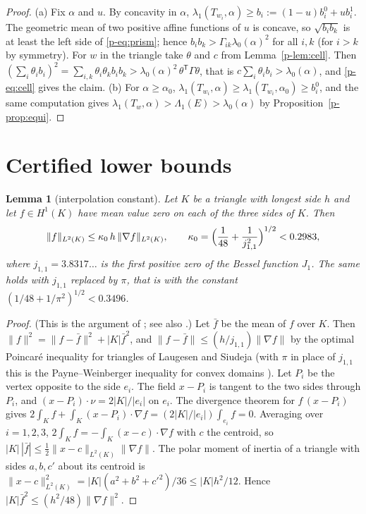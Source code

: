 \documentclass[11pt]{article}
\newtheorem{lemma}[theorem]{Lemma}
\theoremstyle{remark}
\begin{document}
\begin{proof}
(a) Fix $\alpha$ and $u$. By concavity in $\alpha$,
$\lambda_1(T_{w_i},\alpha)\ge b_i:=(1-u)b_i^0+ub_i^1$. The geometric mean of two positive
affine functions of $u$ is concave, so $\sqrt{b_ib_k}$ is at least the left side of
\eqref{p-eq:prism}; hence $b_ib_k>\Gamma_{ik}\lambda_0(\alpha)^2$ for all $i,k$ (for $i>k$ by
symmetry). For $w$ in the triangle take $\theta$ and $c$ from Lemma~\ref{p-lem:cell}. Then
$(\sum_i\theta_ib_i)^2=\sum_{i,k}\theta_i\theta_kb_ib_k>\lambda_0(\alpha)^2\,
\theta^{\mathsf T}\Gamma\theta$, that is $c\sum_i\theta_ib_i>\lambda_0(\alpha)$, and
\eqref{p-eq:cell} gives the claim. (b) For $\alpha\ge\alpha_0$,
$\lambda_1(T_{w_i},\alpha)\ge\lambda_1(T_{w_i},\alpha_0)\ge b_i^0$, and the same computation
gives $\lambda_1(T_w,\alpha)>\Lambda_1(E)>\lambda_0(\alpha)$ by Proposition~\ref{p-prop:equi}.
\end{proof}


\section{Certified lower bounds}\label{p-sec:cert}

\begin{lemma}[interpolation constant]\label{p-lem:interp}
Let $K$ be a triangle with longest side $h$ and let $f\in H^1(K)$ have mean value zero on each
of the three sides of $K$. Then
\[
  \|f\|_{L^2(K)}\le\kappa_0\,h\,\|\nabla f\|_{L^2(K)},\qquad
  \kappa_0=\Bigl(\frac1{48}+\frac1{j_{1,1}^2}\Bigr)^{1/2}<0.2983,
\]
where $j_{1,1}=3.8317\ldots$ is the first positive zero of the Bessel function $J_1$. The same
holds with $j_{1,1}$ replaced by $\pi$, that is with the constant
$(1/48+1/\pi^2)^{1/2}<0.3496$.
\end{lemma}

\begin{proof}
(This is the argument of \cite{CGal}; see also \cite{CG}.) Let $\bar f$ be the mean of $f$ over
$K$. Then $\|f\|^2=\|f-\bar f\|^2+|K|\bar f^2$, and $\|f-\bar f\|\le(h/j_{1,1})\|\nabla f\|$
by the optimal Poincar\'e inequality for triangles of Laugesen and Siudeja \cite{LaSiPoincare}
(with $\pi$ in place of $j_{1,1}$ this is the Payne--Weinberger inequality for convex domains
\cite{PW,Bebendorf}). Let $P_i$ be the vertex opposite to the side $e_i$. The field $x-P_i$ is
tangent to the two sides through $P_i$, and $(x-P_i)\cdot\nu=2|K|/|e_i|$ on $e_i$. The
divergence theorem for $f\,(x-P_i)$ gives
$2\int_Kf+\int_K(x-P_i)\cdot\nabla f=(2|K|/|e_i|)\int_{e_i}f=0$. Averaging over $i=1,2,3$,
$2\int_Kf=-\int_K(x-c)\cdot\nabla f$ with $c$ the centroid, so
$|K|\,|\bar f|\le\frac12\|x-c\|_{L^2(K)}\|\nabla f\|$. The polar moment of inertia of a
triangle with sides $a,b,c'$ about its centroid is $\|x-c\|^2_{L^2(K)}=|K|(a^2+b^2+c'^2)/36\le
|K|h^2/12$. Hence $|K|\bar f^2\le(h^2/48)\|\nabla f\|^2$.
\end{proof}
\end{document}
